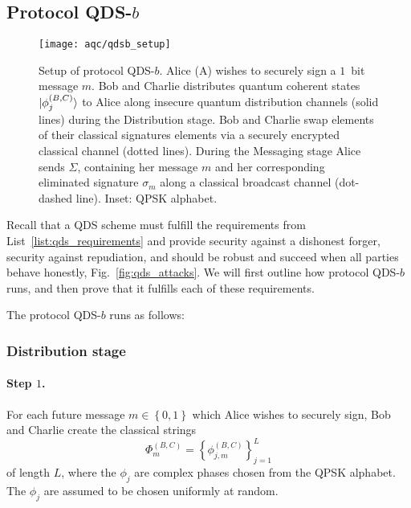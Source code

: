 \subsection{Protocol QDS-$b$}


\begin{figure}[htp]
\captionsetup{width=0.8\linewidth}
\centering
\texttt{[image: aqc/qdsb\_setup]}
\caption{\label{fig:qdsb_setup} Setup of protocol QDS-$b$. Alice (A) wishes to securely sign a $1$~bit message $m$. Bob and Charlie distributes quantum coherent states $\ket{\phi_j^{\left(B, C\right)}}$ to Alice along insecure quantum distribution channels (solid lines) during the Distribution stage. Bob and Charlie swap elements of their classical signatures elements via a securely encrypted classical channel (dotted lines). During the Messaging stage Alice sends $\Sigma$, containing her message $m$ and her corresponding eliminated signature $\sigma_m$ along a classical broadcast channel (dot-dashed line). Inset: QPSK alphabet.}
\end{figure}

Recall that a QDS scheme must fulfill the requirements from List~\ref{list:qds_requirements} and provide security against a dishonest forger, security against repudiation, and should be robust and succeed when all parties behave honestly, Fig.~\ref{fig:qds_attacks}. We will first outline how protocol QDS-$b$ runs, and then prove that it fulfills each of these requirements.

The protocol QDS-$b$ runs as follows:

\subsubsection*{Distribution stage}

\paragraph{Step $1$.}
For each future message $m \in \left\{0, 1\right\}$ which Alice wishes to securely sign, Bob and Charlie create the classical strings
\begin{equation}
\Phi_m^{\left(B, C\right)} = \left\{\phi_{j, m}^{\left(B, C\right)}\right\}_{j=1}^L
\end{equation}
of length $L$, where the $\phi_j$ are complex phases chosen from the QPSK alphabet. The $\phi_j$ are assumed to be chosen uniformly at random.


